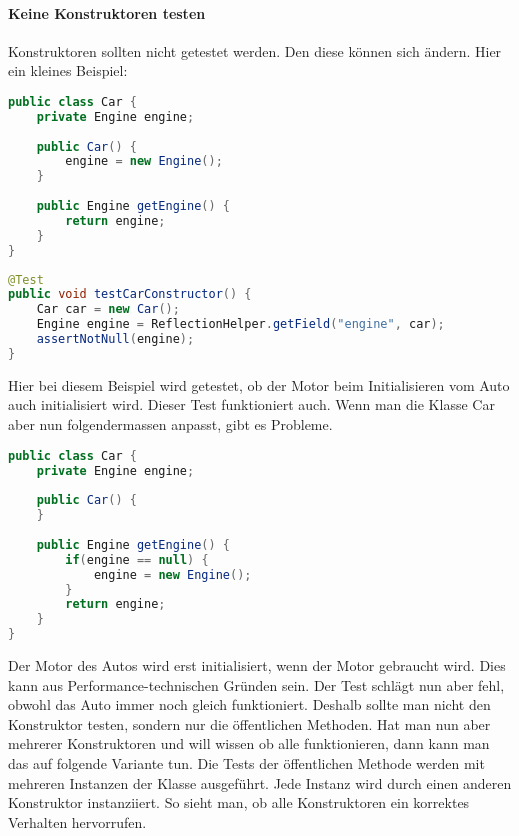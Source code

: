 \paragraph{Keine Konstruktoren testen}
Konstruktoren sollten nicht getestet werden. Den diese können sich ändern. Hier ein kleines Beispiel:
\begin{lstlisting}[language=Java, caption={Klasse Auto}]
public class Car {
	private Engine engine;
	
	public Car() {
		engine = new Engine();
	}
	
	public Engine getEngine() {
		return engine;
	}
}
\end{lstlisting}
\begin{lstlisting}[language=Java, caption={Testklasse}]
@Test
public void testCarConstructor() {
	Car car = new Car();
	Engine engine = ReflectionHelper.getField("engine", car);
	assertNotNull(engine);
}
\end{lstlisting}
Hier bei diesem Beispiel wird getestet, ob der Motor beim Initialisieren vom Auto auch initialisiert wird. Dieser Test funktioniert auch. Wenn man die Klasse Car aber nun folgendermassen anpasst, gibt es Probleme.
\begin{lstlisting}[language=Java, caption={Klasse Auto mit Lazyloading}]
public class Car {
	private Engine engine;
	
	public Car() {
	}
	
	public Engine getEngine() {
		if(engine == null) {
			engine = new Engine();
		}		
		return engine;
	}
}
\end{lstlisting}
Der Motor des Autos wird erst initialisiert, wenn der Motor gebraucht wird. Dies kann aus Performance-technischen Gründen sein. Der Test schlägt nun aber fehl, obwohl das Auto immer noch gleich funktioniert. Deshalb sollte man nicht den Konstruktor testen, sondern nur die öffentlichen Methoden. Hat man nun aber mehrerer Konstruktoren und will wissen ob alle funktionieren, dann kann man das auf folgende Variante tun. Die Tests der öffentlichen Methode werden mit mehreren Instanzen der Klasse ausgeführt. Jede Instanz wird durch einen anderen Konstruktor instanziiert. So sieht man, ob alle Konstruktoren ein korrektes Verhalten hervorrufen.
\cite{web:badpractices}
